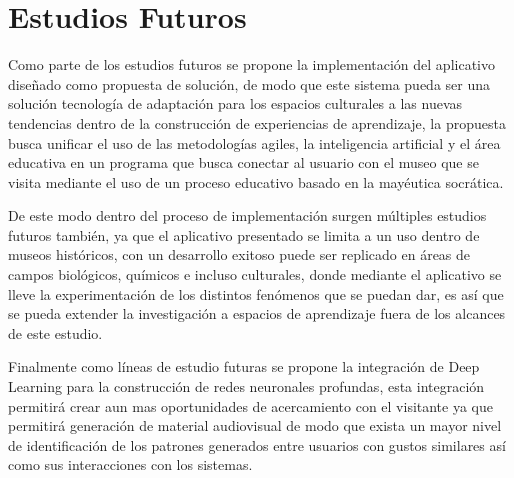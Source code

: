 \documentclass[pdflatex,sn-mathphys-num]{sn-jnl}%
\theoremstyle{thmstyleone}%
\theoremstyle{thmstyletwo}%
\theoremstyle{thmstylethree}%
\begin{document}
\section{Estudios Futuros}\label{secA1}
Como parte de los estudios futuros se propone la implementación del aplicativo diseñado como propuesta de solución, de modo que este sistema pueda ser una solución tecnología de adaptación para los espacios culturales a las nuevas tendencias dentro de la construcción de experiencias de aprendizaje, la propuesta busca unificar el uso de las metodologías agiles, la inteligencia artificial y el área educativa en un programa que busca conectar al usuario con el museo que se visita mediante el uso de un proceso educativo basado en la mayéutica socrática.

De este modo dentro del proceso de implementación surgen múltiples estudios futuros también, ya que el aplicativo presentado se limita a un uso dentro de museos históricos, con un desarrollo exitoso puede ser replicado en áreas de campos biológicos, químicos e incluso culturales, donde mediante el aplicativo se lleve la experimentación de los distintos fenómenos que se puedan dar, es así que se pueda extender la investigación a espacios de aprendizaje fuera de los alcances de este estudio.

Finalmente como líneas de estudio futuras se propone la integración de Deep Learning para la construcción de redes neuronales profundas, esta integración permitirá crear aun mas oportunidades de acercamiento con el visitante ya que permitirá generación de material audiovisual de modo que exista un mayor nivel de identificación de los patrones generados entre usuarios con gustos similares así como sus interacciones con los sistemas.




\end{document}
